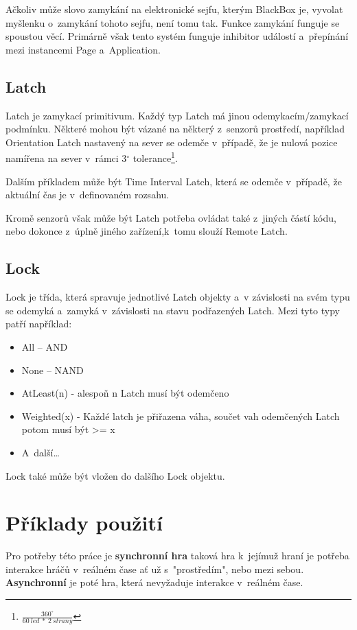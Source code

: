 Ačkoliv může slovo zamykání na elektronické sejfu, kterým BlackBox je, vyvolat myšlenku o~zamykání tohoto sejfu, není tomu tak.
Funkce zamykání funguje se spoustou věcí.
Primárně však tento systém funguje inhibitor událostí a~přepínání mezi instancemi Page a~Application.

\subsection{Latch}
Latch je zamykací primitivum.
Každý typ Latch má jinou odemykacím/zamykací podmínku.
Některé mohou být vázané na některý z~senzorů prostředí, například Orientation Latch nastavený na sever se odemče v~případě, že je nulová pozice namířena na sever v~rámci 3$^{\circ}$ tolerance\footnote{$\frac{360^{\circ}}{60~led~*~2~strany}$}.

Dalším příkladem může být Time Interval Latch, která se odemče v~případě, že aktuální čas je v~definovaném rozsahu.

Kromě senzorů však může být Latch potřeba ovládat také z~jiných částí kódu, nebo dokonce z~úplně jiného zařízení,k~tomu slouží Remote Latch.

\subsection{Lock}

Lock je třída, která spravuje jednotlivé Latch objekty a~v závislosti na svém typu se odemyká a~zamyká v~závislosti na stavu podřazených Latch.
Mezi tyto typy patří například:
\begin{itemize}
    \item All -- AND
    \item None -- NAND
    \item AtLeast(n) - alespoň n Latch musí být odemčeno
    \item Weighted(x) - Každé latch je přiřazena váha, součet vah odemčených Latch potom musí být >= x
    \item A~další\dots
\end{itemize}
Lock také může být vložen do dalšího Lock objektu.

\section{Příklady použití}

Pro potřeby této práce je \textbf{synchronní hra} taková hra k~jejímuž hraní je potřeba interakce hráčů v~reálném čase ať už s~"prostředím", nebo mezi sebou.
\textbf{Asynchronní} je poté hra, která nevyžaduje interakce v~reálném čase.

